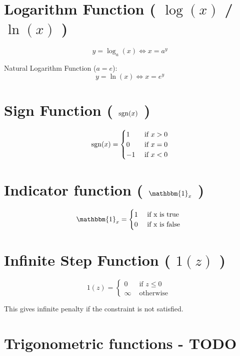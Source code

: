 \section{Logarithm Function ( $\log(x)$ / $\ln(x)$ )}\label{Logarithm Function}
\[
    y = \log_a(x) \Leftrightarrow x = a^y
\]

Natural Logarithm Function ($a=e$):
\[
    y = \ln(x) \Leftrightarrow x = e^y
\]


\section{Sign Function ( $\operatorname{sgn}(x)$ )}\label{Sign Function}
\[
    \operatorname{sgn}(x) = \begin{cases}
         1 & \text{ if } x > 0 \\
         0 & \text{ if } x = 0 \\
         -1 & \text{ if } x < 0 
    \end{cases}
\]



\section{Indicator function ( $\mathbbm{1}_x$ )}\label{Indicator function}

\[
    \mathbbm{1}_x = {\begin{cases}
        1 & \text{ if x is true } \\
        0 & \text{ if x is false }
    \end{cases}}
\]

\section{Infinite Step Function ( $1(z)$ )}

\[
    1(z) = {\begin{cases}
        0 & \text{ if } z \leq 0 \\
        \infty & \text{ otherwise }
    \end{cases}}
\]

This gives infinite penalty if the constraint is not satisfied.


\section{Trigonometric functions - TODO \cite{wiki-Trigonometric_functions}}\label{Trigonometric functions}

